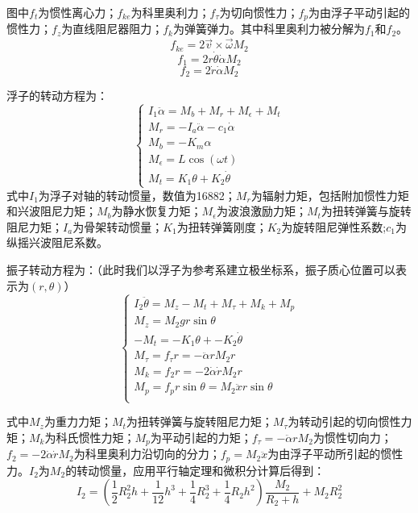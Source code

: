 \documentclass[12pt,utf8]{article}
\begin{document}
图中$f_t$为惯性离心力；$f_{ke}$为科里奥利力；$f_\tau$为切向惯性力；$f_p$为由浮子平动引起的惯性力；$f_z$为直线阻尼器阻力；$f_k$为弹簧弹力。其中科里奥利力被分解为$f_1$和$f_2$。
$$f_{ke}=2\overrightarrow{v}\times\overrightarrow{\omega}M_2$$
$$f_1 = 2r\dot{\theta}\dot{\alpha}M_2$$
$$f_2 = 2\dot{r}\dot{\alpha}M_2$$

浮子的转动方程为：
\begin{equation}
	\begin{cases}
		I_1\ddot{\alpha} =M_b + M_r + M_\epsilon + M_t \\
		M_r = -I_a\ddot{\alpha} - c_1\dot{\alpha} \\
		M_b = -K_m\alpha \\
		M_\epsilon = L\cos(\omega t) \\
		M_t = K_1\theta + K_2\dot{\theta}
		
	\end{cases}
\end{equation}
式中$I_1$为浮子对轴的转动惯量，数值为16882；$M_r$为辐射力矩，包括附加惯性力矩和兴波阻尼力矩；$M_b$为静水恢复力矩；$M_\epsilon$为波浪激励力矩；$M_t$为扭转弹簧与旋转阻尼力矩；$I_a$为骨架转动惯量；$K_1$为扭转弹簧刚度；$K_2$为旋转阻尼弹性系数;$c_1$为纵摇兴波阻尼系数。




振子转动方程为：（此时我们以浮子为参考系建立极坐标系，振子质心位置可以表示为$(r,\theta)$）
\begin{equation}
	\begin{cases}
		I_2\ddot{\theta} = M_z - M_t + M_\tau + M_k + M_p \\
		M_z = M_2 g r \sin\theta \\
		-M_t = -K_1\theta + -K_2\dot{\theta} \\
		M_\tau = f_\tau r = -\ddot{\alpha}rM_2r \\
		M_k = f_2 r = -2\dot{\alpha}\dot{r}M_2r \\
		M_p = f_p r\sin\theta = M_2\ddot{x}r\sin\theta \\
		
		
	\end{cases}
\end{equation}

式中$M_z$为重力力矩；$M_t$为扭转弹簧与旋转阻尼力矩；$M_\tau$为转动引起的切向惯性力矩；$M_k$为科氏惯性力矩；$M_p$为平动引起的力矩；$f_\tau=-\ddot{\alpha}rM_2$为惯性切向力；$f_2=-2\dot{\alpha}\dot{r}M_2$为科里奥利力沿切向的分力；$f_p = M_2\ddot{x}$为由浮子平动所引起的惯性力。$I_2$为$M_2$的转动惯量，应用平行轴定理和微积分计算后得到：
\begin{equation}
	I_2 = (\frac{1}{2}R_2^2h+\frac{1}{12}h^3+\frac{1}{4}R_2^3 + \frac{1}{4}R_2h^2)\frac{M_2}{R_2+h}+M_2R_2^2
\end{equation}
\end{document}
